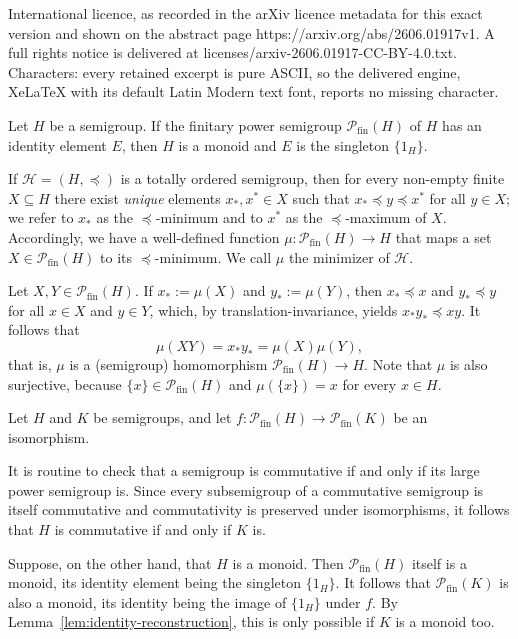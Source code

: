 \documentclass[10pt,a4paper]{amsart}
\newcommand{\Pfin}{\mathcal P_{\mathrm{fin}}}
\newcommand{\evid}[1]{\textsf{#1}}
\newcommand{\fin}{\mathrm{fin}}
\begin{document}
International licence, as recorded in the arXiv licence metadata for this exact version and shown on the abstract page https://arxiv.org/abs/2606.01917v1. A full rights notice is delivered at licenses/arxiv-2606.01917-CC-BY-4.0.txt. Characters: every retained excerpt is pure ASCII, so the delivered engine, XeLaTeX with its default Latin Modern text font, reports no missing character.
\begin{lemma}\label{lem:identity-reconstruction}
Let $H$ be a semigroup. If the finitary power semigroup $\Pfin(H)$ of $H$ has an identity element $E$, then $H$
is a monoid and $E$ is the singleton $\{1_H\}$.
\end{lemma}

\begin{remark}
\label{rem:minimizer}
If $\mathcal H = (H, \preceq)$ is a totally ordered semigroup, then for every non-empty finite $X \subseteq H$ there exist \textit{unique} elements $x_\ast, x^\ast \in X$ such that $x_\ast \preceq y \preceq x^\ast$ for all $y \in X$; we refer to $x_\ast$ as the \evid{$\preceq$-minimum} and to $x^\ast$ as the \evid{$\preceq$-maximum} of $X$. 
Accordingly, we have a well-defined function $\mu \colon \mathcal P_\fin(H) \to H$ that maps a set $X \in \mathcal P_\fin(H)$ to its $\preceq$-minimum. We call $\mu$ the \evid{minimizer} of $\mathcal H$.

Let $X, Y \in \mathcal P_\fin(H)$. If $x_\ast := \mu(X)$ and $y_\ast := \mu(Y)$, then $x_\ast \preceq x$ and $y_\ast \preceq y$ for all $x \in X$ and $y \in Y$, which, by translation-invariance, yields $x_\ast y_\ast \preceq xy$. It follows
that 
\[
\mu(XY) = x_\ast y_\ast = \mu(X) \mu(Y),
\]
that is, $\mu$ is a (semigroup) homomorphism $\mathcal P_\fin(H) \to H$. Note that $\mu$ is also surjective, because $\{x\} \in \mathcal P_\fin(H)$ and $\mu(\{x\}) = x$ for every $x \in H$. 
\end{remark}

\begin{remark}
\label{rem:commutativity-and-unity-are-preserved}
Let $H$ and $K$ be semigroups, and let $f \colon \mathcal{P}_{\fin}(H) \to 
\mathcal{P}_{\fin}(K)$ be an isomorphism.

It is routine to check that a 
semigroup is commutative if and only if its large power semigroup is. 
Since every subsemigroup of a commutative semigroup is itself commutative and commutativity is preserved under isomorphisms, it follows that $H$ is commutative if and only if $K$ is.

Suppose, on the other hand, that $H$ is a monoid. Then $\mathcal P_\fin(H)$ 
itself is a monoid, its identity element being the singleton $\{1_H\}$. 
It follows that $\mathcal P_\fin(K)$ is also a monoid, its identity 
being the image of $\{1_H\}$ under $f$. By Lemma~\ref{lem:identity-reconstruction}, this is only possible if $K$ is a monoid too.
\end{remark}
\end{document}
